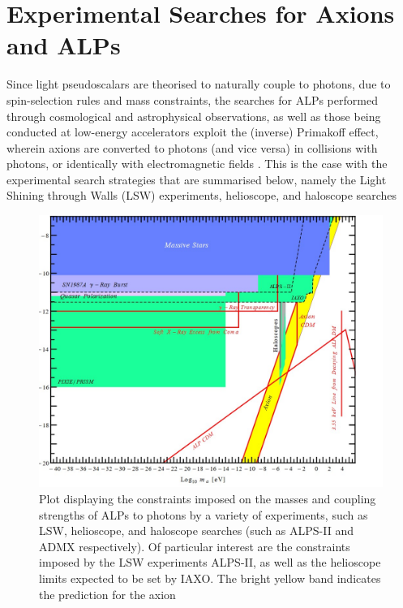 \section{Experimental Searches for Axions and ALPs}\label{ALPExpt} 
Since light pseudoscalars are theorised to naturally couple to photons, due to spin-selection rules and mass constraints, the searches for ALPs performed through cosmological and astrophysical observations, as well as those
being conducted at low-energy accelerators exploit the (inverse) Primakoff effect, wherein axions are converted to photons (and vice versa) in collisions with photons, or identically with electromagnetic fields \cite{d'Enterria:2753504}. This is the case with the experimental search strategies
that are summarised below, namely the Light Shining through Walls (LSW) experiments, helioscope, and haloscope searches
\begin{figure}[H]
    \centering
    \includegraphics[scale = 0.45]{ALPExperimentalConstraints.jpg}
    \caption{Plot displaying the constraints imposed on the masses and coupling strengths of ALPs to photons by a variety of experiments, such as LSW, helioscope, and haloscope searches (such as ALPS-II and ADMX respectively). Of particular interest are the constraints imposed by the LSW experiments ALPS-II, as well as the helioscope limits expected to be set by IAXO. The bright yellow band indicates
    the prediction for the axion}
    \label{ALPExperimentalConstraints}
\end{figure}
